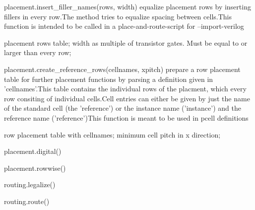 \begin{APIfunc}{placement.insert\_filler\_names(rows, width)}
    equalize placement rows by inserting fillers in every row.The method tries to equalize spacing between cells.This function is intended to be called in a place-and-route-script for --import-verilog
    \begin{APIparameters}
            placement rows table;
            width as multiple of transistor gates. Must be equal to or larger than every row;
    \end{APIparameters}
\end{APIfunc}
\begin{APIfunc}{placement.create\_reference\_rows(cellnames, xpitch)}
    prepare a row placement table for further placement functions by parsing a definition given in 'cellnames'.This table contains the individual rows of the placment, which every row consiting of individual cells.Cell entries can either be given by just the name of the standard cell (the 'reference') or the instance name ('instance') and the reference name ('reference')This function is meant to be used in pcell definitions
    \begin{APIparameters}
            row placement table with cellnames;
            minimum cell pitch in x direction;
    \end{APIparameters}
\end{APIfunc}
\begin{APIfunc}{placement.digital()}
    
    \begin{APIparameters}
    \end{APIparameters}
\end{APIfunc}
\begin{APIfunc}{placement.rowwise()}
    
    \begin{APIparameters}
    \end{APIparameters}
\end{APIfunc}
\begin{APIfunc}{routing.legalize()}
    
    \begin{APIparameters}
    \end{APIparameters}
\end{APIfunc}
\begin{APIfunc}{routing.route()}
    
    \begin{APIparameters}
    \end{APIparameters}
\end{APIfunc}
